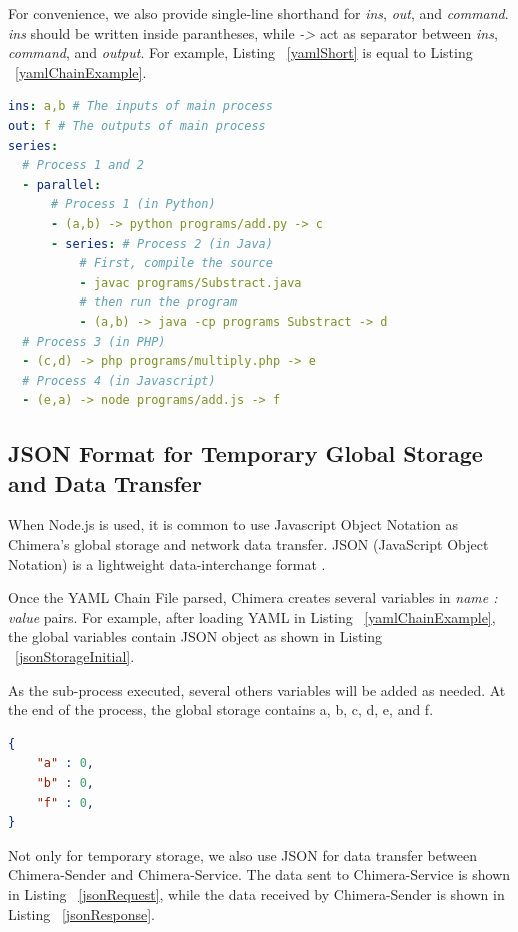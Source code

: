 \documentclass[conference]{IEEEtran}
\begin{document}
For convenience, we also provide single-line shorthand for {\it ins}, {\it out}, 
and {\it command}. {\it ins} should be written inside parantheses, while {\it ->}
act as separator between {\it ins}, {\it command}, and {\it output}. For example,
Listing  ~\ref{yamlShort} is equal to Listing ~\ref{yamlChainExample}.

\begin{lstlisting}[caption=YAML Chain With Shorthand, label=yamlShort, language=yaml, basicstyle=\small, breaklines=true]
ins: a,b # The inputs of main process 
out: f # The outputs of main process 
series:
  # Process 1 and 2 
  - parallel:
      # Process 1 (in Python) 
      - (a,b) -> python programs/add.py -> c
      - series: # Process 2 (in Java) 
          # First, compile the source  
          - javac programs/Substract.java
          # then run the program 
          - (a,b) -> java -cp programs Substract -> d
  # Process 3 (in PHP) 
  - (c,d) -> php programs/multiply.php -> e
  # Process 4 (in Javascript) 
  - (e,a) -> node programs/add.js -> f
\end{lstlisting}


\subsection{JSON Format for Temporary Global Storage and Data Transfer}

When Node.js is used, it is common to use Javascript Object Notation as Chimera's
global storage and network data transfer. JSON (JavaScript Object Notation) is a 
lightweight data-interchange format \cite{json}.

Once the YAML Chain File parsed, Chimera creates several variables in {\it name : 
value} pairs. For example, after loading YAML in Listing ~\ref{yamlChainExample}, the
global variables contain JSON object as shown in Listing ~\ref{jsonStorageInitial}.

As the sub-process executed, several others variables will be added as needed. At the
end of the process, the global storage contains a, b, c, d, e, and f.

\begin{lstlisting}[caption=Initial content of JSON Storage, label=jsonStorageInitial, language=json, basicstyle=\small, breaklines=true]
{
    "a" : 0,
    "b" : 0,
    "f" : 0,
}
\end{lstlisting}

Not only for temporary storage, we also use JSON for data transfer between 
Chimera-Sender and Chimera-Service. The data sent to Chimera-Service is shown in Listing
~\ref{jsonRequest}, while the data received by Chimera-Sender is shown in Listing
~\ref{jsonResponse}.
\end{document}
